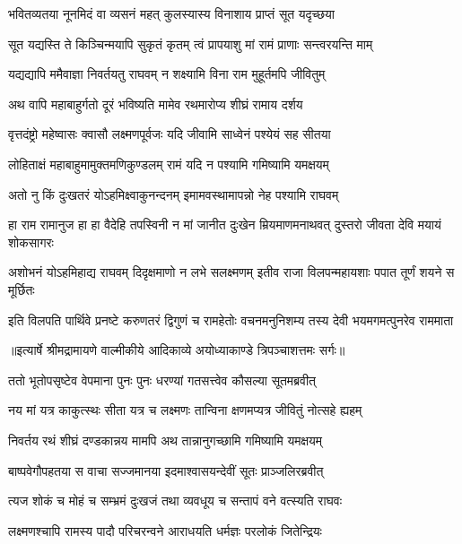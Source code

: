 \twolineshloka
{भवितव्यतया नूनमिदं वा व्यसनं महत्}
{कुलस्यास्य विनाशाय प्राप्तं सूत यदृच्छया} %

\twolineshloka
{सूत यद्यस्ति ते किञ्चिन्मयापि सुकृतं कृतम्}
{त्वं प्रापयाशु मां रामं प्राणाः सन्त्वरयन्ति माम्} %

\twolineshloka
{यद्यद्यापि ममैवाज्ञा निवर्तयतु राघवम्}
{न शक्ष्यामि विना राम मुहूर्तमपि जीवितुम्} %

\twolineshloka
{अथ वापि महाबाहुर्गतो दूरं भविष्यति}
{मामेव रथमारोप्य शीघ्रं रामाय दर्शय} %

\twolineshloka
{वृत्तदंष्ट्रो महेष्वासः क्वासौ लक्ष्मणपूर्वजः}
{यदि जीवामि साध्वेनं पश्येयं सह सीतया} %

\twolineshloka
{लोहिताक्षं महाबाहुमामुक्तमणिकुण्डलम्}
{रामं यदि न पश्यामि गमिष्यामि यमक्षयम्} %

\twolineshloka
{अतो नु किं दुःखतरं योऽहमिक्ष्वाकुनन्दनम्}
{इमामवस्थामापन्नो नेह पश्यामि राघवम्} %

\threelineshloka
{हा राम रामानुज हा हा वैदेहि तपस्विनी}
{न मां जानीत दुःखेन म्रियमाणमनाथवत्}
{दुस्तरो जीवता देवि मयायं शोकसागरः} %

\fourlineindentedshloka
{अशोभनं योऽहमिहाद्य राघवम्}
{दिदृक्षमाणो न लभे सलक्ष्मणम्}
{इतीव राजा विलपन्महायशाः}
{पपात तूर्णं शयने स मूर्छितः} %

\fourlineindentedshloka
{इति विलपति पार्थिवे प्रनष्टे}
{करुणतरं द्विगुणं च रामहेतोः}
{वचनमनुनिशम्य तस्य देवी}
{भयमगमत्पुनरेव राममाता} %


{॥इत्यार्षे श्रीमद्रामायणे वाल्मीकीये आदिकाव्ये अयोध्याकाण्डे त्रिपञ्चाशत्तमः सर्गः॥}


\twolineshloka
{ततो भूतोपसृष्टेव वेपमाना पुनः पुनः}
{धरण्यां गतसत्त्वेव कौसल्या सूतमब्रवीत्} %

\twolineshloka
{नय मां यत्र काकुत्स्थः सीता यत्र च लक्ष्मणः}
{तान्विना क्षणमप्यत्र जीवितुं नोत्सहे ह्यहम्} %

\twolineshloka
{निवर्तय रथं शीघ्रं दण्डकान्नय मामपि}
{अथ तान्नानुगच्छामि गमिष्यामि यमक्षयम्} %

\twolineshloka
{बाष्पवेगौपहतया स वाचा सज्जमानया}
{इदमाश्वासयन्देवीं सूतः प्राञ्जलिरब्रवीत्} %

\twolineshloka
{त्यज शोकं च मोहं च सम्भ्रमं दुःखजं तथा}
{व्यवधूय च सन्तापं वने वत्स्यति राघवः} %

\twolineshloka
{लक्ष्मणश्चापि रामस्य पादौ परिचरन्वने}
{आराधयति धर्मज्ञः परलोकं जितेन्द्रियः} %

